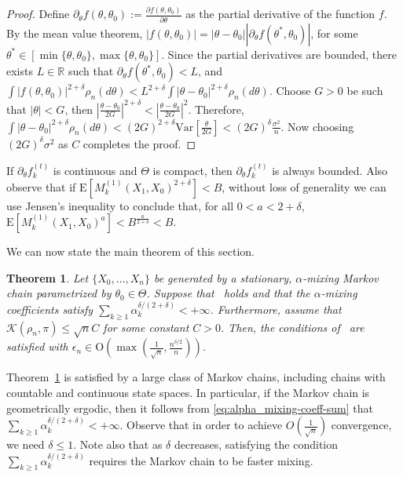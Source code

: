 \documentclass[11pt]{amsart}
\newcommand{\E}{\mathrm{E}}
\newcommand{\Var}{\mathrm{Var}}
\newtheorem{theorem}{Theorem}[section]
\begin{document}
\begin{proof}
 Define $\partial_{\theta} f(\theta,\theta_0) := \frac{\partial f(\theta,\theta_0)}{\partial \theta}$ as the partial derivative of the function $f$. By the mean value theorem, $|f(\theta,\theta_0)|=|\theta-\theta_0||\partial_{\theta}  f(\theta^*,\theta_0)|$, for some $\theta^* \in [\min\{\theta,\theta_0\},\max\{\theta,\theta_0\}]$. Since the partial derivatives are bounded, there exists $L \in \mathbb R$ such that $\partial_{\theta} f(\theta^*,\theta_0)<L$, and $\int |f(\theta,\theta_0)|^{2+\delta}\rho_n(d\theta)<L^{2+\delta}\int |\theta-\theta_0|^{2+\delta} \rho_n(d\theta) $. 
Choose $G>0$ be such that $|\theta|<G$, then  $\left|\frac{\theta-\theta_0}{2G}\right|^{2+\delta}<\left|\frac{\theta-\theta_0}{2G}\right|^{2}$. Therefore, $\int |\theta-\theta_0|^{2+\delta} \rho_n(d\theta) < (2G)^{2+\delta} \Var\left[\frac{\theta}{2G}\right]<(2G)^{\delta}\frac{\sigma^2}{n}$. Now choosing $(2G)^{\delta}\sigma^2$ as $C$ completes the proof.
\end{proof}
If $\partial_{\theta}  f^{(t)}_k$ is continuous and $\Theta$ is compact, then $\partial_{\theta}  f^{(t)}_k$ is always bounded. Also observe that if $\E\left[M^{(1)}_k(X_1,X_{0})^{2+\delta}\right]<B$, without loss of generality we can use Jensen's inequality to conclude that, for all $0<a<2+\delta$,  $\E\left[M^{(1)}_k(X_1,X_{0})^a\right]<B^{\frac{a}{2+\delta}}<B$.

\sloppy We can now state the main theorem of this section. 
\begin{theorem}\label{thm:lip-gen}
  Let $\{X_0,\ldots,X_n\}$ be generated by a stationary, $\alpha$-mixing Markov chain parametrized by $\theta_0 \in \Theta$. Suppose that~ holds and that the $\alpha$-mixing coefficients satisfy $\sum_{k \geq 1} \alpha_k^{\delta/(2+\delta)} < +\infty$. Furthermore, assume that $\mathcal{K}(\rho_n,\pi)\leq \sqrt{n}C$ for some constant $C>0$. Then, the conditions of~ are satisfied with $\epsilon_n\in\mathrm{O}\left(\max(\frac{1}{\sqrt{n}},\frac{n^{\delta/2}}{n})\right)$.
\end{theorem}
%
Theorem~\ref{thm:lip-gen} is satisfied by a large class of Markov chains, including chains with countable and continuous state spaces. In particular, if the Markov chain is geometrically ergodic, then it follows from \cref{eq:alpha_mixing-coeff-sum} that $\sum_{k \geq 1} \alpha_k^{\delta/(2+\delta)} < +\infty$.
Observe that in order to achieve $O(\frac{1}{\sqrt{n}})$ convergence, we need $\delta \le 1$. 
Note also that as $\delta$ decreases, satisfying the condition $\sum_{k \geq 1} \alpha_k^{\delta/(2+\delta)}$ requires the Markov chain to be faster mixing.
\end{document}
